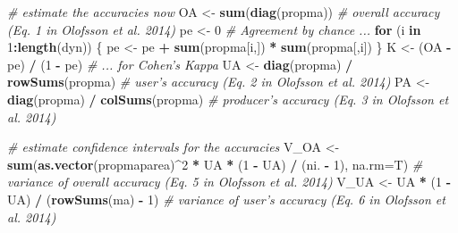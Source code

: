 \documentclass[a4paper, notitlepage, 12pt, krantz2]{krantz}
\newenvironment{Shaded}{\begin{snugshade}}{\end{snugshade}}
\newcommand{\CommentTok}[1]{\textcolor[rgb]{0.56,0.35,0.01}{\textit{#1}}}
\newcommand{\ControlFlowTok}[1]{\textcolor[rgb]{0.13,0.29,0.53}{\textbf{#1}}}
\newcommand{\DataTypeTok}[1]{\textcolor[rgb]{0.13,0.29,0.53}{#1}}
\newcommand{\DecValTok}[1]{\textcolor[rgb]{0.00,0.00,0.81}{#1}}
\newcommand{\KeywordTok}[1]{\textcolor[rgb]{0.13,0.29,0.53}{\textbf{#1}}}
\newcommand{\NormalTok}[1]{#1}
\newcommand{\OperatorTok}[1]{\textcolor[rgb]{0.81,0.36,0.00}{\textbf{#1}}}
\newcommand{\StringTok}[1]{\textcolor[rgb]{0.31,0.60,0.02}{#1}}
\begin{document}
\begin{Shaded}
\begin{Highlighting}[]
  \CommentTok{# estimate the accuracies now}
\NormalTok{  OA <-}\StringTok{ }\KeywordTok{sum}\NormalTok{(}\KeywordTok{diag}\NormalTok{(propma))              }\CommentTok{# overall accuracy (Eq. 1 in Olofsson et al. 2014)}
\NormalTok{  pe <-}\StringTok{ }\DecValTok{0}                              \CommentTok{# Agreement by chance ...}
  \ControlFlowTok{for}\NormalTok{ (i }\ControlFlowTok{in} \DecValTok{1}\OperatorTok{:}\KeywordTok{length}\NormalTok{(dyn)) \{}
\NormalTok{    pe <-}\StringTok{ }\NormalTok{pe }\OperatorTok{+}\StringTok{ }\KeywordTok{sum}\NormalTok{(propma[i,]) }\OperatorTok{*}\StringTok{ }\KeywordTok{sum}\NormalTok{(propma[,i])}
\NormalTok{  \}}
\NormalTok{  K  <-}\StringTok{ }\NormalTok{(OA }\OperatorTok{-}\StringTok{ }\NormalTok{pe) }\OperatorTok{/}\StringTok{ }\NormalTok{(}\DecValTok{1} \OperatorTok{-}\StringTok{ }\NormalTok{pe)           }\CommentTok{# ... for Cohen's Kappa}
\NormalTok{  UA <-}\StringTok{ }\KeywordTok{diag}\NormalTok{(propma) }\OperatorTok{/}\StringTok{ }\KeywordTok{rowSums}\NormalTok{(propma) }\CommentTok{# user's accuracy (Eq. 2 in Olofsson et al. 2014)}
\NormalTok{  PA <-}\StringTok{ }\KeywordTok{diag}\NormalTok{(propma) }\OperatorTok{/}\StringTok{ }\KeywordTok{colSums}\NormalTok{(propma) }\CommentTok{# producer's accuracy (Eq. 3 in Olofsson et al. 2014)}
  
  \CommentTok{# estimate confidence intervals for the accuracies}
\NormalTok{  V_OA <-}\StringTok{ }\KeywordTok{sum}\NormalTok{(}\KeywordTok{as.vector}\NormalTok{(propmaparea)}\OperatorTok{^}\DecValTok{2} \OperatorTok{*}\StringTok{ }\NormalTok{UA }\OperatorTok{*}\StringTok{ }\NormalTok{(}\DecValTok{1} \OperatorTok{-}\StringTok{ }\NormalTok{UA) }\OperatorTok{/}\StringTok{ }\NormalTok{(ni. }\OperatorTok{-}\StringTok{ }\DecValTok{1}\NormalTok{), }\DataTypeTok{na.rm=}\NormalTok{T)  }\CommentTok{# variance of overall accuracy (Eq. 5 in Olofsson et al. 2014)}
\NormalTok{  V_UA <-}\StringTok{ }\NormalTok{UA }\OperatorTok{*}\StringTok{ }\NormalTok{(}\DecValTok{1} \OperatorTok{-}\StringTok{ }\NormalTok{UA) }\OperatorTok{/}\StringTok{ }\NormalTok{(}\KeywordTok{rowSums}\NormalTok{(ma) }\OperatorTok{-}\StringTok{ }\DecValTok{1}\NormalTok{) }\CommentTok{# variance of user's accuracy (Eq. 6 in Olofsson et al. 2014)}
  

\end{Highlighting}
\end{Shaded}
\end{document}
